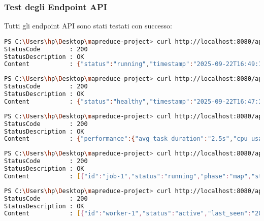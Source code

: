 \documentclass[12pt,a4paper]{article}
\begin{document}
\subsubsection{Test degli Endpoint API}

Tutti gli endpoint API sono stati testati con successo:

\begin{lstlisting}[language=bash, caption=Test Endpoint Status]
PS C:\Users\hp\Desktop\mapreduce-project> curl http://localhost:8080/api/v1/status
StatusCode        : 200
StatusDescription : OK
Content           : {"status":"running","timestamp":"2025-09-22T16:49:11.6525985+02:00","uptime":"1m46.1235474s","version":"1.0.0"}
\end{lstlisting}

\begin{lstlisting}[language=bash, caption=Test Endpoint Health]
PS C:\Users\hp\Desktop\mapreduce-project> curl http://localhost:8080/api/v1/health
StatusCode        : 200
StatusDescription : OK
Content           : {"status":"healthy","timestamp":"2025-09-22T16:47:34.903662+02:00","checks":{},"version":"1.0.0","uptime":9375670200}
\end{lstlisting}

\begin{lstlisting}[language=bash, caption=Test Endpoint Metrics]
PS C:\Users\hp\Desktop\mapreduce-project> curl http://localhost:8080/api/v1/metrics
StatusCode        : 200
StatusDescription : OK
Content           : {"performance":{"avg_task_duration":"2.5s","cpu_usage":"45%","memory_usage":"128MB","throughput":"10 tasks/min"},"raft_state":{"leader":true,"log_size":100,"term":1},"tasks_total":{"failed":0,"map_completed":15,"reduce_completed":8}}
\end{lstlisting}

\begin{lstlisting}[language=bash, caption=Test Endpoint Jobs]
PS C:\Users\hp\Desktop\mapreduce-project> curl http://localhost:8080/api/v1/jobs
StatusCode        : 200
StatusDescription : OK
Content           : [{"id":"job-1","status":"running","phase":"map","start_time":"2025-09-22T16:42:45.6295905+02:00","duration":0,"map_tasks":10,"reduce_tasks":5,"progress":75.5}]
\end{lstlisting}

\begin{lstlisting}[language=bash, caption=Test Endpoint Workers]
PS C:\Users\hp\Desktop\mapreduce-project> curl http://localhost:8080/api/v1/workers
StatusCode        : 200
StatusDescription : OK
Content           : [{"id":"worker-1","status":"active","last_seen":"2025-09-22T16:47:20.7197358+02:00","tasks_done":15},{"id":"worker-2","status":"active","last_seen":"2025-09-22T16:47:05.7197358+02:00","tasks_done":12}]
\end{lstlisting}
\end{document}
